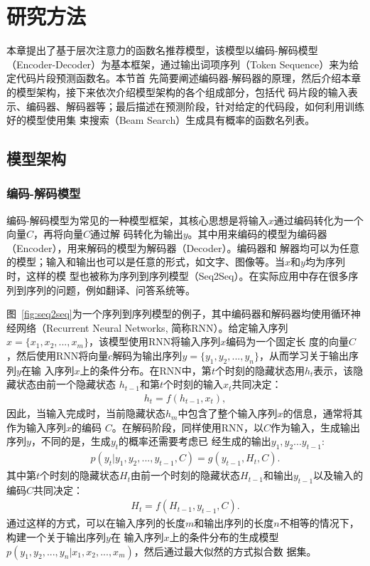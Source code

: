 \section{研究方法}
本章提出了基于层次注意力的函数名推荐模型，该模型以编码-解码模型~\cite{Kyunghyun2014Learning}
（Encoder-Decoder）为基本框架，通过输出词项序列（Token Sequence）来为给定代码片段预测函数名。本节首
先简要阐述编码器-解码器的原理，然后介绍本章的模型架构，接下来依次介绍模型架构的各个组成部分，包括代
码片段的输入表示、编码器、解码器等；最后描述在预测阶段，针对给定的代码段，如何利用训练好的模型使用集
束搜索（Beam Search）生成具有概率的函数名列表。



\subsection{模型架构}


\subsubsection{编码-解码模型}
编码-解码模型为常见的一种模型框架，其核心思想是将输入$x$通过编码转化为一个向量$C$，再将向量$C$通过解
码转化为输出$y$。其中用来编码的模型为编码器（Encoder），用来解码的模型为解码器（Decoder）。编码器和
解器均可以为任意的模型；输入和输出也可以是任意的形式，如文字、图像等。当$x$和$y$均为序列时，这样的模
型也被称为序列到序列模型（Seq2Seq）。在实际应用中存在很多序列到序列的问题，例如翻译、问答系统等。

图~\ref{fig:seq2seq}为一个序列到序列模型的例子，其中编码器和解码器均使用循环神经网络（Recurrent Neural
Networks, 简称RNN）。给定输入序列$x=\{x_1,x_2,...,x_m\}$，该模型使用RNN将输入序列$x$编码为一个固定长
度的向量$C$，然后使用RNN将向量$c$解码为输出序列$y=\{y_1,y_2,...,y_n\}$，从而学习关于输出序列$y$在输
入序列$x$上的条件分布。在RNN中，第$t$个时刻的隐藏状态用$h_t$表示，该隐藏状态由前一个隐藏状态
$h_{t-1}$和第$t$个时刻的输入$x_t$共同决定：
\begin{eqnarray}
    h_t = f(h_{t-1},x_t),
\end{eqnarray}
因此，当输入完成时，当前隐藏状态$h_m$中包含了整个输入序列$x$的信息，通常将其作为输入序列$x$的编码
$C$。在解码阶段，同样使用RNN，以$C$作为输入，生成输出序列$y$，不同的是，生成$y_t$的概率还需要考虑已
经生成的输出$y_1,y_2...y_{t-1}$:
\begin{eqnarray}
    p(y_t|y_1,y_2,...,y_{t-1},C) = g(y_{t-1},H_t,C).
\end{eqnarray}
其中第$t$个时刻的隐藏状态$H_t$由前一个时刻的隐藏状态$H_{t-1}$和输出$y_{t-1}$以及输入的编码$C$共同决定：
\begin{eqnarray}
    H_t = f(H_{t-1},y_{t-1},C).
\end{eqnarray}
通过这样的方式，可以在输入序列的长度$m$和输出序列的长度$n$不相等的情况下，构建一个关于输出序列$y$在
输入序列$x$上的条件分布的生成模型$p(y_1,y_2,...,y_n|x_1,x_2,...,x_m)$，然后通过最大似然的方式拟合数
据集。

